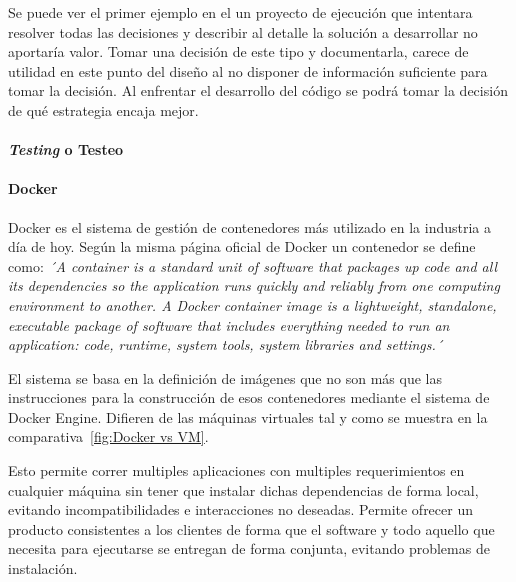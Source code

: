 Se puede ver el primer ejemplo en el un proyecto de ejecución que intentara resolver todas las decisiones y describir al detalle la solución a desarrollar no aportaría valor.
Tomar una decisión de este tipo y documentarla, carece de utilidad en este punto del diseño al no disponer de información suficiente para tomar la decisión.
Al enfrentar el desarrollo del código se podrá tomar la decisión de qué estrategia encaja mejor.

\paragraph{\textit{Testing} o Testeo}
    

\paragraph{Docker}

Docker es el sistema de gestión de contenedores más utilizado en la industria a día de hoy.
Según la misma página oficial de Docker un contenedor se define como: \textit{´A container is a standard unit of software that packages up code and all its dependencies so the application runs quickly and reliably from one computing environment to another.
A Docker container image is a lightweight, standalone, executable package of software that includes everything needed to run an application: code, runtime, system tools, system libraries and settings.´}~\cite{docker}

El sistema se basa en la definición de imágenes que no son más que las instrucciones para la construcción de esos contenedores mediante el sistema de Docker Engine.
Difieren de las máquinas virtuales tal y como se muestra en la comparativa~\cref{fig:Docker vs VM}.

Esto permite correr multiples aplicaciones con multiples requerimientos en cualquier máquina sin tener que instalar dichas dependencias de forma local, evitando incompatibilidades e interacciones no deseadas.
Permite ofrecer un producto consistentes a los clientes de forma que el software y todo aquello que necesita para ejecutarse se entregan de forma conjunta, evitando problemas de instalación.


